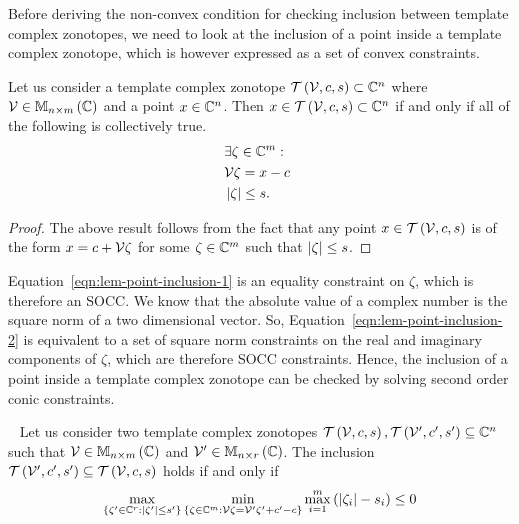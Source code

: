 Before deriving the non-convex condition for checking inclusion
between template complex zonotopes, we need to look at the inclusion
of a point inside a template complex zonotope, which is however
expressed as a set of convex constraints.
%
\begin{lemma}
Let us consider a template complex zonotope
$\mathit{\operatorname{\mathcal{T}}}\left(\mathcal{V},c,s\right)\subset\mathbb{C}^n$ where
$\mathcal{V}\in\mathbb{M}_{n\times m}\left(\mathbb{C}\right)$ and a point $x\in\mathbb{C}^n$.  Then
$x\in\mathit{\operatorname{\mathcal{T}}}\left(\mathcal{V},c,s\right)\subset\mathbb{C}^n$ if and only if
all of the following is collectively true.
%
\begin{align}
& \exists\zeta\in\mathbb{C}^m:\nonumber\\
& \mathcal{V}\zeta = x-c~\label{eqn:lem-point-inclusion-1}\\
& \left|\zeta\right|\leq s.~\label{eqn:lem-point-inclusion-2}
\end{align}
%
\end{lemma}
%
\begin{proof}
The above result follows from the fact that any point 
$x\in\mathit{\operatorname{\mathcal{T}}}\left(\mathcal{V},c,s\right)$ is of the form
$x=c+\mathcal{V}\zeta$ for some $\zeta\in\mathbb{C}^m$ such that
$\left|\zeta\right|\leq s$.
\end{proof}
%
Equation~\ref{eqn:lem-point-inclusion-1} is an equality constraint on
$\zeta$, which is therefore an SOCC.  We know that the absolute value
of a complex number is the square norm of a two dimensional vector.
So, Equation~\ref{eqn:lem-point-inclusion-2} is equivalent to a set of
square norm constraints on the real and imaginary components of
$\zeta$, which are therefore SOCC constraints.  Hence, the inclusion
of a point inside a template complex zonotope can be checked by
solving second order conic constraints.
%
\begin{lemma}~\label{lem:exact-inclusion}
Let us consider two template complex zonotopes
$\mathit{\operatorname{\mathcal{T}}}\left(\mathcal{V},c,s\right),
\mathit{\operatorname{\mathcal{T}}}\left(\mathcal{V}^\prime,c^\prime,s^\prime\right)\subseteq\mathbb{C}^n$ such
that $\mathcal{V}\in\mathbb{M}_{n\times m}\left(\mathbb{C}\right)$ and
$\mathcal{V}^\prime\in\mathbb{M}_{n\times r}\left(\mathbb{C}\right)$.  The inclusion
$\mathit{\operatorname{\mathcal{T}}}\left(\mathcal{V}^\prime,c^\prime,s^\prime\right)\subseteq\mathit{\operatorname{\mathcal{T}}}\left(\mathcal{V},c,s\right)$
holds if and only if
\begin{equation}\label{eqn:exact-inclusion}
\max_{\left\{\zeta^\prime\in\mathbb{C}^{r}:\left|\zeta^\prime\right|\leq s^\prime\right\}}\min_{\left\{\zeta\in\mathbb{C}^m:\mathcal{V}\zeta=\mathcal{V}^\prime\zeta^\prime+c^\prime-c\right\}}\max_{i=1}^m\left(\left|\zeta_i\right|-s_i\right)\leq 0
\end{equation}
\end{lemma}
